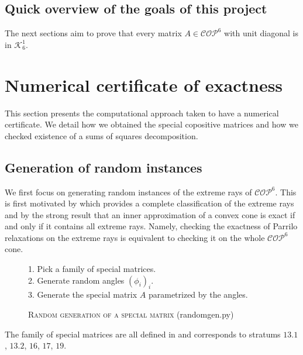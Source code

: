 \documentclass[onecolumn,11pt,a4paper]{article}
\theoremstyle{plain}  %
\theoremstyle{remark}  %
\providecommand*{\hr}[1][class-arg]{%
    \hspace*{\fill}\hrulefill\hspace*{\fill}
    \vskip 0.65\baselineskip
}
\begin{document}
\subsection{Quick overview of the goals of this project}
The next sections aim to prove that every matrix $A \in \mathcal{COP}^6$ with unit diagonal is in $\mathcal{K}_6^1$.
\hr{} %
\section{Numerical certificate of exactness}
\label{sec:computation}
This section presents the computational approach taken to have a numerical certificate.
We detail how we obtained the special copositive matrices and how we checked existence of a sums of squares decomposition.
\subsection{Generation of random instances}
\label{sub:generation}
We first focus on generating random instances of the extreme rays of $\mathcal{COP}^6$. This is first motivated by \cite{afonin2020extreme} which provides
a complete classification of the extreme rays and by the strong result that an inner approximation of a convex cone is exact if and only if
it contains all extreme rays. Namely, checking the exactness of Parrilo relaxations on the extreme rays is equivalent to checking it on the whole $\mathcal{COP}^6$ cone.
\begin{figure}[h!]
	\begin{framed}
		1. Pick a family of special matrices.\\
		2. Generate random angles $(\phi_i)_i$.\\
		3. Generate the special matrix $A$ parametrized by the angles.
	\end{framed}
	\caption{\textsc{Random generation of a special matrix} (randomgen.py)}
	\label{algo:random-instances}
\end{figure}

The family of special matrices are all defined in \cite{afonin2020extreme} 
and corresponds to stratums $13.1$, $13.2$, $16$, $17$, $19$.
\end{document}
